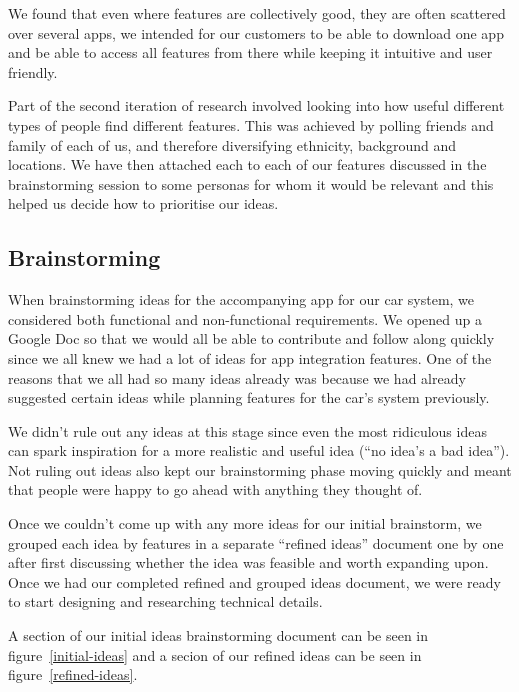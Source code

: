 \documentclass{article}
\begin{document}
We found that even where features are collectively good, they are often scattered over several apps, we intended for our customers to be able to download one app and be able to access all features from there while keeping it intuitive and user friendly.

Part of the second iteration of research involved looking into how useful different types of people find different features. This was achieved by polling friends and family of each of us, and therefore diversifying ethnicity, background and locations. We have then attached each to each of our features discussed in the brainstorming session to some personas for whom it would be relevant and this helped us decide how to prioritise our ideas.

\subsection{Brainstorming}\label{ssec:app-brainstorming} %
When brainstorming ideas for the accompanying app for our car system, we considered both functional and non-functional requirements. We opened up a Google Doc so that we would all be able to contribute and follow along quickly since we all knew we had a lot of ideas for app integration features. One of the reasons that we all had so many ideas already was because we had already suggested certain ideas while planning features for the car's system previously.

We didn't rule out any ideas at this stage since even the most ridiculous ideas can spark inspiration for a more realistic and useful idea (``no idea's a bad idea''). Not ruling out ideas also kept our brainstorming phase moving quickly and meant that people were happy to go ahead with anything they thought of.

Once we couldn't come up with any more ideas for our initial brainstorm, we grouped each idea by features in a separate ``refined ideas'' document one by one after first discussing whether the idea was feasible and worth expanding upon. Once we had our completed refined and grouped ideas document, we were ready to start designing and researching technical details.

A section of our initial ideas brainstorming document can be seen in figure~\ref{initial-ideas} and a secion of our refined ideas can be seen in figure~\ref{refined-ideas}.
\end{document}
